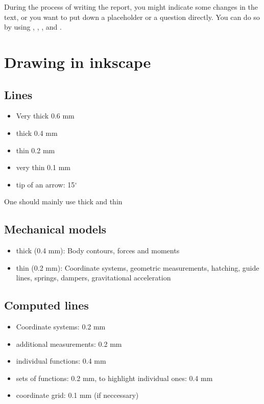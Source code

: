 \documentclass[a4paper,10pt,english]{article}
\begin{document}
During the process of writing the report, you might indicate some changes in the text, or you want to put down a placeholder or a question directly. You can do so by using , , ,  and .

\section{Drawing in inkscape}
%
\subsection*{Lines}
\begin{itemize}
	\item Very thick 0.6 mm
	\item thick 0.4 mm
	\item thin 0.2 mm
	\item very thin 0.1 mm
	\item tip of an arrow: 15$^\circ$
\end{itemize}
One should mainly use thick and thin

\subsection*{Mechanical models}
%
\begin{itemize}
	\item thick (0.4 mm): Body contours, forces and moments
	\item thin (0.2 mm): Coordinate systems, geometric measurements, hatching, guide lines, springs, dampers, gravitational acceleration
\end{itemize}

\subsection*{Computed lines}
\begin{itemize}
	\item Coordinate systems: 0.2 mm
	\item additional measurements: 0.2 mm
	\item individual functions: 0.4 mm
	\item sets of functions: 0.2 mm, to highlight individual ones: 0.4 mm
	\item coordinate grid: 0.1 mm (if neccessary)
\end{itemize}
\end{document}
